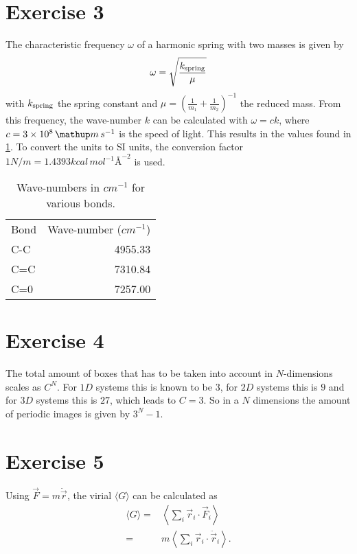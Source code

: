 \documentclass[titlepage]{report}
\begin{document}
\section{Exercise 3}
The characteristic frequency $ \omega $ of a harmonic spring with two masses is given by \cite[p. 164]{Taylor05}
\begin{equation}
	\omega = \sqrt{\frac{k_{\rm{spring}}}{\mu}} 
\end{equation}
with $ k_{\rm{spring}} $ the spring constant and $ \mu = \left(\frac{1}{m_1} + \frac{1}{m_2}\right)^{-1} $ the reduced mass. 
From this frequency, the wave-number $ k $ can be calculated with $ \omega = c k $, where $ c = 3\E{8}\unit{m \, s^{-1}} $ is the speed of light. This results in the values found in \cref{tab:THEX3wavenumbers}.
To convert the units to SI units, the conversion factor $ 1\unit{N/m} = 1.4393 \unit{kcal \, mol^{-1} \textrm{\AA}^{-2}} $ is used.
\begin{table}[h!]
	\centering
	\caption{Wave-numbers in $ \unit{cm^{-1}} $ for various bonds.}
	\label{tab:THEX3wavenumbers}
	\begin{tabular}{lr}
		Bond & Wave-number ($\unit{cm^{-1}}$) \\ 
		C-C & 4955.33 \\ 
		C=C & 7310.84 \\ 
		C=0 & 7257.00
	\end{tabular} 
\end{table}

\section{Exercise 4}
The total amount of boxes that has to be taken into account in $ N $-dimensions scales as $ C^N $.
For $ 1D $ systems this is known to be $ 3 $, for $ 2D $ systems this is $ 9 $ and for $ 3D $ systems this is $ 27 $, which leads to $ C=3 $.
So in a $ N $ dimensions the amount of periodic images is given by $ 3^N - 1 $.

\section{Exercise 5}
Using $ \vec{F} = m \ddot{\vec{r}} $, the virial $ \langle G \rangle $ can be calculated as
\begin{subequations}
	\begin{align}
		\langle G \rangle =& \left\langle \sum_i \vec{r}_i \cdot \vec{F}_i \right\rangle\\
		=& m \left\langle \sum_i \vec{r}_i \cdot \ddot{\vec{r}}_i \right\rangle.
	\end{align}
\end{subequations}
\end{document}
